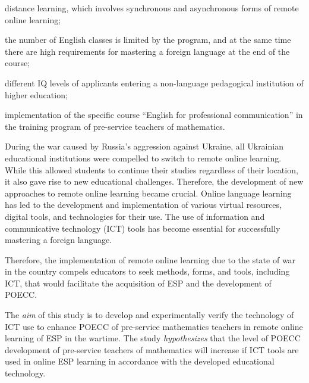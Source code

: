  \begin{enumerate*}[label=\arabic*)] 
		\item distance learning, which involves synchronous and asynchronous forms of remote online learning; 
		\item the number of English classes is limited by the program, and at the same time there are high requirements for mastering a foreign language at the end of the course; 
		\item different IQ levels of applicants entering a non-language pedagogical institution of higher education; 
		\item implementation of the specific course “English for professional communication” in the training program of pre-service teachers of mathematics.
\end{enumerate*}

During the war caused by Russia’s aggression against Ukraine, all Ukrainian educational institutions were compelled to switch to\textbf{\textit{ }}remote online learning. While this allowed students to continue their studies regardless of their location, it also gave rise to new educational challenges. Therefore, the development of new approaches to remote online learning became crucial. Online language learning has led to the development and implementation of various virtual resources, digital tools, and technologies for their use. The use of information and communicative technology (ICT) tools has become essential for successfully mastering a foreign language.

Therefore, the implementation of remote online learning due to the state of war in the country compels educators to seek methods, forms, and tools, including ICT, that would facilitate the acquisition of ESP and the development of POECC.

The \textit{aim} of this study is to develop and experimentally verify the technology of ICT use to enhance POECC of pre-service mathematics teachers in remote online learning of ESP in the wartime. The study \textit{hypothesizes} that the level of POECC development of pre-service teachers of mathematics will increase if ICT tools are used in online ESP learning in accordance with the developed educational technology.
